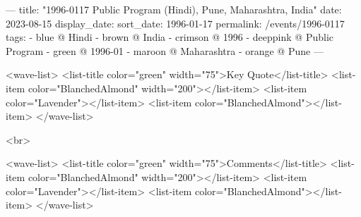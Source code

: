 ---
title: "1996-0117 Public Program (Hindi), Pune, Maharashtra, India"
date: 2023-08-15
display_date: 
sort_date: 1996-01-17
permalink: /events/1996-0117
tags:
  - blue @ Hindi
  - brown @ India
  - crimson @ 1996
  - deeppink @ Public Program
  - green @ 1996-01
  - maroon @ Maharashtra
  - orange @ Pune
---

<wave-list>
  <list-title color="green" width="75">Key Quote</list-title>
  <list-item color="BlanchedAlmond"  width="200"></list-item>
  <list-item color="Lavender"></list-item>
  <list-item color="BlanchedAlmond"></list-item>
</wave-list>

<br>

<wave-list>
  <list-title color="green" width="75">Comments</list-title>
  <list-item color="BlanchedAlmond"  width="200"></list-item>
  <list-item color="Lavender"></list-item>
  <list-item color="BlanchedAlmond"></list-item>
</wave-list>